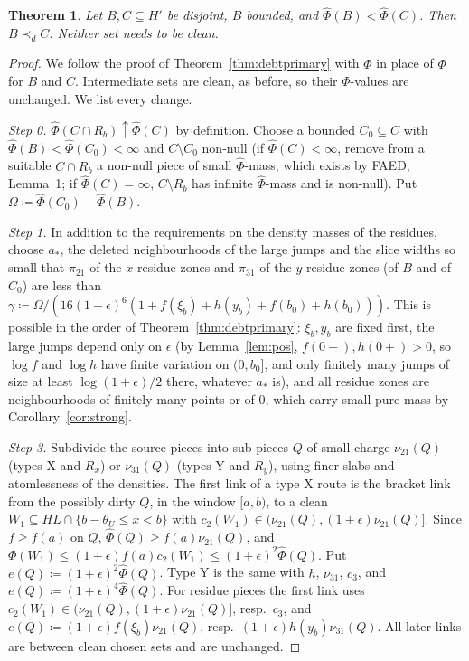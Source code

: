 \documentclass[11pt]{article}
\newtheorem{theorem}{Theorem}
\theoremstyle{definition}\newtheorem{definition}[theorem]{Definition}
\theoremstyle{remark}\newtheorem{remark}[theorem]{Remark}
\newcommand{\Phihat}{\widehat\Phi}
\begin{document}
\begin{theorem}\label{thm:dirtyprimary}
Let $B,C\subseteq H'$ be disjoint, $B$ bounded, and
$\Phihat(B)<\Phihat(C)$. Then $B\prec_dC$. Neither set needs to be clean.
\end{theorem}
\begin{proof}
We follow the proof of Theorem~\ref{thm:debtprimary} with $\Phihat$ in place
of $\Phi$ for $B$ and $C$. Intermediate sets are clean, as before, so their
$\Phi$-values are unchanged. We list every change.

\emph{Step 0.} $\Phihat(C\cap R_b)\uparrow\Phihat(C)$ by definition. Choose a
bounded $C_0\subseteq C$ with $\Phihat(B)<\Phihat(C_0)<\infty$ and
$C\setminus C_0$ non-null (if $\Phihat(C)<\infty$, remove from a suitable
$C\cap R_b$ a non-null piece of small $\Phihat$-mass, which exists by FAED,
Lemma~1; if $\Phihat(C)=\infty$, $C\setminus R_b$ has infinite $\Phihat$-mass
and is non-null). Put $\Omega\coloneqq\Phihat(C_0)-\Phihat(B)$.

\emph{Step 1.} In addition to the requirements on the density masses of the
residues, choose $a_*$, the deleted neighbourhoods of the large jumps and
the slice widths so small that $\pi_{21}$ of the $x$-residue zones and
$\pi_{31}$ of the $y$-residue zones (of $B$ and of $C_0$) are less than
$\gamma\coloneqq\Omega/(16(1+\epsilon)^6(1+f(\xi_b)+h(y_b)+f(b_0)+h(b_0)))$.
This is possible in the order of Theorem~\ref{thm:debtprimary}: $\xi_b,y_b$ are fixed
first, the large jumps depend only on $\epsilon$ (by
Lemma~\ref{lem:pos}, $f(0+),h(0+)>0$, so $\log f$ and $\log h$ have finite
variation on $(0,b_0]$, and only finitely many jumps of size at least
$\log(1+\epsilon)/2$ there, whatever $a_*$ is), and all residue zones are
neighbourhoods of finitely many points or of $0$, which carry small pure mass
by Corollary~\ref{cor:strong}.

\emph{Step 3.} Subdivide the source pieces into sub-pieces $Q$ of small
charge $\nu_{21}(Q)$ (types X and $R_x$) or $\nu_{31}(Q)$ (types Y and $R_y$),
using finer slabs and atomlessness of the densities. The first link of a
type X route is the bracket link from the possibly dirty $Q$, in the window
$[a,b)$, to a clean $W_1\subseteq HL\cap\{b-\theta_U\le x<b\}$ with
$c_2(W_1)\in(\nu_{21}(Q),(1+\epsilon)\nu_{21}(Q)]$. Since $f\ge f(a)$ on
$Q$, $\Phihat(Q)\ge f(a)\nu_{21}(Q)$, and
$\Phi(W_1)\le(1+\epsilon)f(a)c_2(W_1)\le(1+\epsilon)^2\Phihat(Q)$. Put
$e(Q)\coloneqq(1+\epsilon)^2\Phihat(Q)$. Type Y is the same with $h$,
$\nu_{31}$, $c_3$, and $e(Q)\coloneqq(1+\epsilon)^4\Phihat(Q)$. For residue
pieces the first link uses $c_2(W_1)\in(\nu_{21}(Q),(1+\epsilon)\nu_{21}(Q)]$,
resp.\ $c_3$, and $e(Q)\coloneqq(1+\epsilon)f(\xi_b)\nu_{21}(Q)$, resp.\
$(1+\epsilon)h(y_b)\nu_{31}(Q)$. All later links are between clean chosen
sets and are unchanged.


\end{proof}
\end{document}
